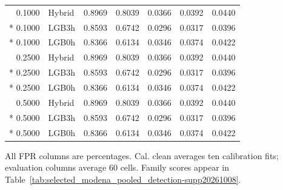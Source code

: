 \begin{longtable}{@{}rlrrrrr@{}}
0.1000 & Hybrid & 0.8969 & 0.8039 & 0.0366 & 0.0392 & 0.0440 \\*
0.1000 & LGB3h & 0.8593 & 0.6742 & 0.0296 & 0.0317 & 0.0396 \\*
0.1000 & LGB0h & 0.8366 & 0.6134 & 0.0346 & 0.0374 & 0.0422 \\
0.2500 & Hybrid & 0.8969 & 0.8039 & 0.0366 & 0.0392 & 0.0440 \\*
0.2500 & LGB3h & 0.8593 & 0.6742 & 0.0296 & 0.0317 & 0.0396 \\*
0.2500 & LGB0h & 0.8366 & 0.6134 & 0.0346 & 0.0374 & 0.0422 \\
0.5000 & Hybrid & 0.8969 & 0.8039 & 0.0366 & 0.0392 & 0.0440 \\*
0.5000 & LGB3h & 0.8593 & 0.6742 & 0.0296 & 0.0317 & 0.0396 \\*
0.5000 & LGB0h & 0.8366 & 0.6134 & 0.0346 & 0.0374 & 0.0422 \\
\end{longtable}
\noindent\footnotesize All FPR columns are percentages. Cal. clean averages ten calibration fits; evaluation columns average 60 cells. Family scores appear in Table~\ref{tab:selected_modena_pooled_detection-supp20261008}.
\par\endgroup
